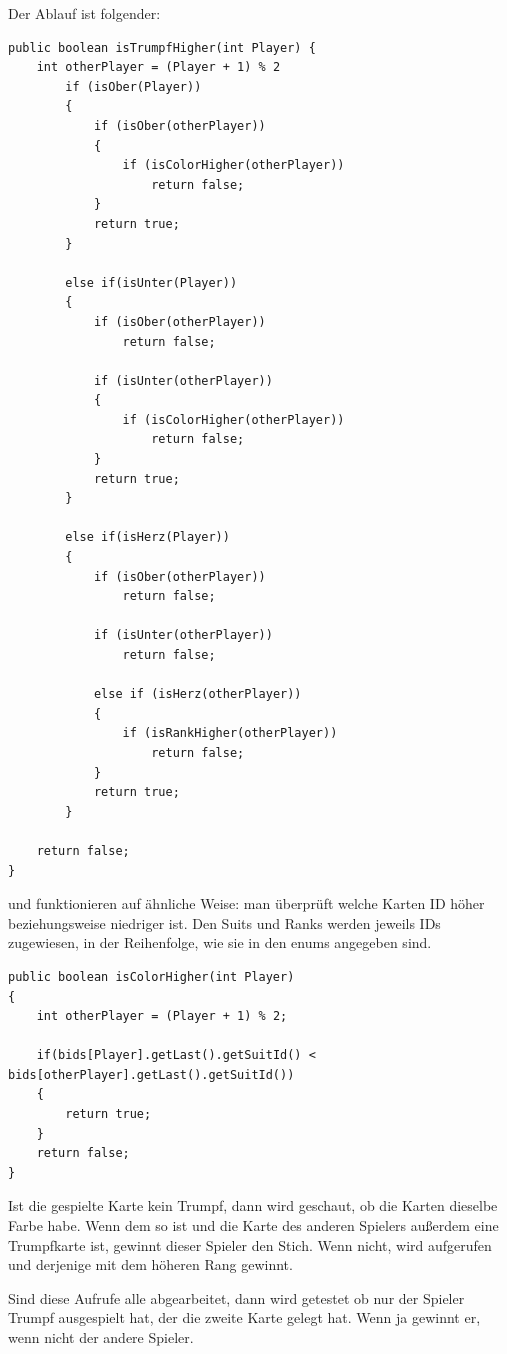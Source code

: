 Der Ablauf ist folgender:
\begin{lstlisting}[caption={isTrumpfHigher Methode},captionpos=b]
public boolean isTrumpfHigher(int Player) {
    int otherPlayer = (Player + 1) % 2
        if (isOber(Player))
        {
            if (isOber(otherPlayer))
            {
                if (isColorHigher(otherPlayer))
                    return false;
            }
            return true;
        }

        else if(isUnter(Player))
        {
            if (isOber(otherPlayer))
                return false;

            if (isUnter(otherPlayer))
            {
                if (isColorHigher(otherPlayer))
                    return false;
            }
            return true;
        }

        else if(isHerz(Player))
        {
            if (isOber(otherPlayer))
                return false;

            if (isUnter(otherPlayer))
                return false;

            else if (isHerz(otherPlayer))
            {
                if (isRankHigher(otherPlayer))
                    return false;
            }
            return true;
        }

    return false;
}
\end{lstlisting}
 
 und  funktionieren auf ähnliche
Weise: man überprüft welche Karten ID höher beziehungsweise niedriger ist. Den
Suits und Ranks werden jeweils IDs zugewiesen, in der Reihenfolge, wie sie in
den enums angegeben sind.

\begin{lstlisting}[caption={IDs am Beispiel von isColorHigher},captionpos=b]
public boolean isColorHigher(int Player)
{
    int otherPlayer = (Player + 1) % 2;

    if(bids[Player].getLast().getSuitId() < bids[otherPlayer].getLast().getSuitId())
    {
        return true;
    }
    return false;
}
\end{lstlisting}

Ist die gespielte Karte kein Trumpf, dann wird geschaut, ob die Karten dieselbe
Farbe habe. Wenn dem so ist und die Karte des anderen Spielers außerdem eine
Trumpfkarte ist, gewinnt dieser Spieler den Stich. Wenn nicht, wird
 aufgerufen und derjenige mit dem höheren Rang gewinnt.

Sind diese Aufrufe alle abgearbeitet, dann wird getestet ob nur der Spieler
Trumpf ausgespielt hat, der die zweite Karte gelegt hat. Wenn ja gewinnt er,
wenn nicht der andere Spieler.

